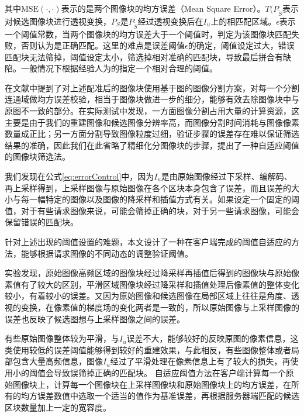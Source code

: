 \documentclass[UTF8]{csoarticle}
\begin{document}
其中\(\text{MSE}(\cdot,\cdot)\)表示的是两个图像块的均方误差（Mean Square Error）。\(T(P_{\tilde{S}}\)表示对候选图像块进行透视变换，\(P_{S}\)是\(P_{\tilde{S}}\)经过透视变换后在\(I_u\)上的相匹配区域。\(\epsilon\)表示一个阈值常数，当两个图像块的均方误差大于一个阈值时，判定为该图像块匹配失败，否则认为是正确匹配。这里的难点是误差阈值\(\epsilon\)的确定，阈值设定过大，错误匹配块无法筛掉，阈值设定太小，筛选掉相对准确的匹配块，导致最后拼合有缺陷。一般情况下根据经验人为的指定一个相对合理的阈值。

在文献\cite{Dai:2012vn}中提到了对上述配准后的图像块使用基于图的图像分割方案，对每一个分割连通域做均方误差校验，相当于图像块做进一步的细分，能够有效去除图像块中与原图不一致的部分。在实际测试中发现，一方面图像分割占用大量的计算资源，这主要是由于我们的重建图像和候选图像分辨率高，而图像分割时间消耗与图像像素数量成正比；另一方面分割导致图像粒度过细，验证步骤的误差存在难以保证筛选结果的准确，因此我们在此省略了精细化分图像块的步骤，提出了一种自适应阈值的图像块筛选法。

我们发现在公式\ref{eq:errorControl}中，因为\(I_u\)是由原始图像经过下采样、编解码、再上采样得到，上采样图像与原始图像在各个区块本身包含了误差，而且误差的大小与每一幅特定的图像以及图像的降采样和插值方式有关。如果设定一个固定的阈值，对于有些请求图像来说，可能会筛掉正确的块，对于另一些请求图像，可能会保留错误的匹配块。

针对上述出现的阈值设置的难题，本文设计了一种在客户端完成的阈值自适应的方法，能够根据请求图像的不同动态的调整验证阈值。

实验发现，原始图像高频区域的图像块经过降采样再插值后得到的图像块与原始像素值有了较大的区别，平滑区域图像块经过降采样和插值处理后像素值的整体变化较小，有着较小的误差。又因为原始图像和候选图像在局部区域上往往是角度、透视的变换，在像素值的梯度场的变化两者是一致的，所以原始图像与上采样图像的误差也反映了候选图想与上采样图像之间的误差。

有些原始图像整体较为平滑，与\(I_u\)误差不大，能够较好的反映原图的像素信息，这类使用较低的误差阈值能够得到较好的重建效果，与此相反，有些图像整体或者局部包含大量高频信息，图像\(I_u\)经过了平滑处理在像素信息上有了较大的损失，再使用小的阈值会导致误筛掉正确的匹配块。
自适应阈值方法在客户端计算每一个原始图像块上，计算每一个图像块在上采样图像块和原始图像块上的均方误差，在所有的均方误差数值中选取一个适当的值作为基准误差，再根据服务器端匹配的候选区块数量加上一定的宽容度。
\end{document}
